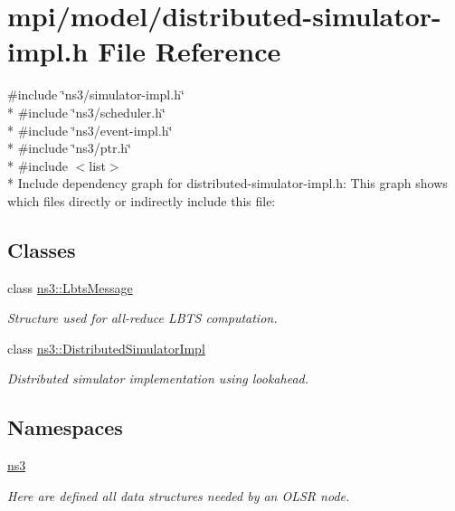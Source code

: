 \hypertarget{distributed-simulator-impl_8h}{}\section{mpi/model/distributed-\/simulator-\/impl.h File Reference}
\label{distributed-simulator-impl_8h}
{\ttfamily \#include \char`\"{}ns3/simulator-\/impl.\+h\char`\"{}}\\*
{\ttfamily \#include \char`\"{}ns3/scheduler.\+h\char`\"{}}\\*
{\ttfamily \#include \char`\"{}ns3/event-\/impl.\+h\char`\"{}}\\*
{\ttfamily \#include \char`\"{}ns3/ptr.\+h\char`\"{}}\\*
{\ttfamily \#include $<$list$>$}\\*
Include dependency graph for distributed-\/simulator-\/impl.h\+:
This graph shows which files directly or indirectly include this file\+:
\subsection*{Classes}
\begin{DoxyCompactItemize}
\item 
class \hyperlink{classns3_1_1LbtsMessage}{ns3\+::\+Lbts\+Message}
\begin{DoxyCompactList}\small\item\em Structure used for all-\/reduce L\+B\+TS computation. \end{DoxyCompactList}\item 
class \hyperlink{classns3_1_1DistributedSimulatorImpl}{ns3\+::\+Distributed\+Simulator\+Impl}
\begin{DoxyCompactList}\small\item\em Distributed simulator implementation using lookahead. \end{DoxyCompactList}\end{DoxyCompactItemize}
\subsection*{Namespaces}
\begin{DoxyCompactItemize}
\item 
 \hyperlink{namespacens3}{ns3}
\begin{DoxyCompactList}\small\item\em Here are defined all data structures needed by an O\+L\+SR node. \end{DoxyCompactList}\end{DoxyCompactItemize}
